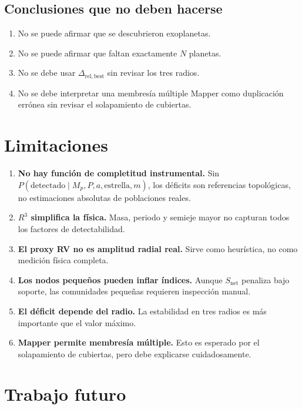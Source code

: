 \documentclass[11pt]{article}
\begin{document}
\subsection{Conclusiones que no deben hacerse}

\begin{enumerate}
    \item No se puede afirmar que se descubrieron exoplanetas.
    \item No se puede afirmar que faltan exactamente $N$ planetas.
    \item No se debe usar $\Delta_{\mathrm{rel,best}}$ sin revisar los tres radios.
    \item No se debe interpretar una membresía múltiple Mapper como duplicación errónea sin revisar el solapamiento de cubiertas.
\end{enumerate}

\section{Limitaciones}

\begin{enumerate}
    \item \textbf{No hay función de completitud instrumental.} Sin $P(\mathrm{detectado}\mid M_p,P,a,\mathrm{estrella},m)$, los déficits son referencias topológicas, no estimaciones absolutas de poblaciones reales.
    \item \textbf{$R^3$ simplifica la física.} Masa, periodo y semieje mayor no capturan todos los factores de detectabilidad.
    \item \textbf{El proxy RV no es amplitud radial real.} Sirve como heurística, no como medición física completa.
    \item \textbf{Los nodos pequeños pueden inflar índices.} Aunque $S_{\mathrm{net}}$ penaliza bajo soporte, las comunidades pequeñas requieren inspección manual.
    \item \textbf{El déficit depende del radio.} La estabilidad en tres radios es más importante que el valor máximo.
    \item \textbf{Mapper permite membresía múltiple.} Esto es esperado por el solapamiento de cubiertas, pero debe explicarse cuidadosamente.
\end{enumerate}

\section{Trabajo futuro}
\end{document}
